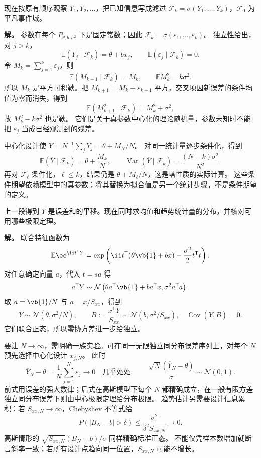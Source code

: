 \begin{exbox}[逐次观测的条件期望与鞅]
现在按原有顺序观察 $Y_1,Y_2,\ldots$，把已知信息写成滤过 $\mathcal F_k=\sigma(Y_1,\ldots,Y_k)$，$\mathcal F_0$ 为平凡事件域。

\textbf{解。} 参数在每个 $P_{\theta,b,\sigma^2}$ 下是固定常数；因此 $\mathcal F_k=\sigma(\varepsilon_1,\ldots,\varepsilon_k)$。
独立性给出，对 $j>k$，
\[
 \mathbb E(Y_j\mid\mathcal F_k)=\theta+b x_j,
 \qquad \mathbb E(\varepsilon_j\mid\mathcal F_k)=0.
\]
令 $M_k=\sum_{j=1}^k\varepsilon_j$，则
\[
 \mathbb E(M_{k+1}\mid\mathcal F_k)=M_k,\qquad
 \mathbb E M_k^2=k\sigma^2.
\]
所以 $M_k$ 是平方可积鞅。把 $M_{k+1}=M_k+\varepsilon_{k+1}$ 平方，交叉项因新误差的条件均值为零而消失，得到
\[
 \mathbb E(M_{k+1}^2\mid\mathcal F_k)=M_k^2+\sigma^2,
\]
故 $M_k^2-k\sigma^2$ 也是鞅。
它们是关于真参数中心化的理论随机量，参数未知时不能把 $\varepsilon_j$ 当成已经观测到的残差。

中心化设计使 $\overline Y=N^{-1}\sum_jY_j=\theta+M_N/N$。
对同一统计量逐步条件化，得到
\[
 \mathbb E(\overline Y\mid\mathcal F_k)=\theta+\frac{M_k}{N},
 \qquad
 \operatorname{Var}(\overline Y\mid\mathcal F_k)=\frac{(N-k)\sigma^2}{N^2}.
\]
再对 $\mathcal F_\ell$ 条件化，$\ell\le k$，结果仍是 $\theta+M_\ell/N$，这是塔性质的实际计算。
这些条件期望依赖模型中的真参数；将其替换为拟合值是另一个统计步骤，不是条件期望的定义。
\end{exbox}

\begin{exbox}[线性统计量的分布与大样本条件]
上一段得到 $\overline Y$ 是误差和的平移。现在同时求均值和趋势统计量的分布，并核对可用哪些极限定理。

\textbf{解。} 联合特征函数为
\[
 \mathbb E \ee^{\ii t^{\mathsf T}Y}
 =\exp\left(\ii t^{\mathsf T}(\theta\vb{1}+b x)
 -\frac{\sigma^2}2t^{\mathsf T}t\right).
\]
对任意确定向量 $a$，代入 $t=s a$ 得
\[
 a^{\mathsf T}Y\sim\mathcal N
 \left(\theta a^{\mathsf T}\vb{1}+b a^{\mathsf T}x,
 \sigma^2a^{\mathsf T}a\right).
\]
取 $a=\vb{1}/N$ 与 $a=x/S_{xx}$，得到
\[
 \overline Y\sim\mathcal N(\theta,\sigma^2/N),\qquad
 B:=\frac{x^{\mathsf T}Y}{S_{xx}}
 \sim\mathcal N(b,\sigma^2/S_{xx}),
 \quad \operatorname{Cov}(\overline Y,B)=0.
\]
它们联合正态，所以零协方差进一步给独立。

要让 $N\to\infty$，需明确一族实验。可在同一无限独立同分布误差序列上，对每个 $N$ 预先选择中心化设计 $x_{j,N}$。
此时
\[
 \overline Y_N-\theta=\frac1N\sum_{j=1}^N\varepsilon_j
 \longrightarrow0\quad\text{几乎处处},
 \qquad \frac{\sqrt N(\overline Y_N-\theta)}\sigma\sim\mathcal N(0,1).
\]
前式用误差的强大数律；后式在高斯模型下每个 $N$ 都精确成立，在一般有限方差独立同分布误差下则由中心极限定理给分布极限。
趋势估计另需要设计信息累积：若 $S_{xx,N}\to\infty$，Chebyshev 不等式给
\[
 P(|B_N-b|>\delta)\le\frac{\sigma^2}{\delta^2 S_{xx,N}}\to0.
\]
高斯情形的 $\sqrt{S_{xx,N}}(B_N-b)/\sigma$ 同样精确标准正态。
不能仅凭样本数增加就断言斜率一致；若所有设计点趋向同一位置，$S_{xx,N}$ 可能不增长。
\end{exbox}

